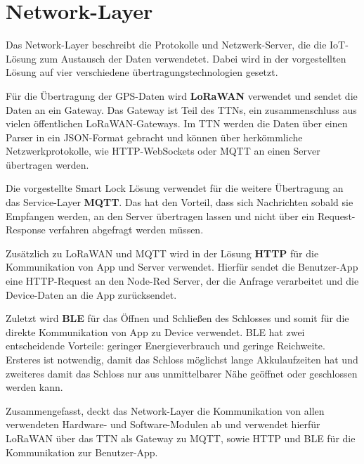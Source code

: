 
\section{Network-Layer} \label{network}
Das Network-Layer beschreibt die Protokolle und Netzwerk-Server, die die \ac{IoT}-Lösung zum Austausch der Daten verwendetet. Dabei wird in der vorgestellten Lösung auf vier verschiedene übertragungstechnologien gesetzt.

Für die Übertragung der \ac{GPS}-Daten wird \textbf{\ac{LoRaWAN}} verwendet und sendet die Daten an ein Gateway. Das Gateway ist Teil des \ac{TTN}s, ein zusammenschluss aus vielen öffentlichen \ac{LoRaWAN}-Gateways. Im \ac{TTN} werden die Daten über einen Parser in ein \ac{JSON}-Format gebracht und können über herkömmliche Netzwerkprotokolle, wie \ac{HTTP}-WebSockets oder \ac{MQTT} an einen Server übertragen werden.

Die vorgestellte Smart Lock Lösung verwendet für die weitere Übertragung an das Service-Layer \textbf{\ac{MQTT}}. Das hat den Vorteil, dass sich Nachrichten sobald sie Empfangen werden, an den Server übertragen lassen und nicht über ein Request-Response verfahren abgefragt werden müssen. 

Zusätzlich zu \ac{LoRaWAN} und \ac{MQTT} wird in der Lösung \textbf{\ac{HTTP}} für die Kommunikation von App und Server verwendet. Hierfür sendet die Benutzer-App eine \ac{HTTP}-Request an den Node-Red Server, der die Anfrage verarbeitet und die Device-Daten an die App zurücksendet. 

Zuletzt wird \textbf{\ac{BLE}} für das Öffnen und Schließen des Schlosses und somit für die direkte Kommunikation von App zu Device verwendet. \ac{BLE} hat zwei entscheidende Vorteile: geringer Energieverbrauch und geringe Reichweite. Ersteres ist notwendig, damit das Schloss möglichst lange Akkulaufzeiten hat und zweiteres damit das Schloss nur aus unmittelbarer Nähe geöffnet oder geschlossen werden kann.

Zusammengefasst, deckt das Network-Layer die Kommunikation von allen verwendeten Hardware- und Software-Modulen ab und verwendet hierfür \ac{LoRaWAN} über das \ac{TTN} als Gateway zu \ac{MQTT}, sowie \ac{HTTP} und \ac{BLE} für die Kommunikation zur Benutzer-App.

